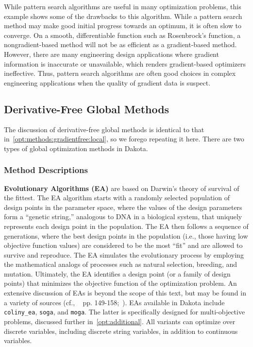 While pattern search algorithms are useful in many optimization
problems, this example shows some of the drawbacks to this algorithm.
While a pattern search method may make good initial progress towards
an optimum, it is often slow to converge. On a smooth, differentiable
function such as Rosenbrock's function, a nongradient-based method
will not be as efficient as a gradient-based method. However, there
are many engineering design applications where gradient information is
inaccurate or unavailable, which renders gradient-based optimizers
ineffective. Thus, pattern search algorithms are often good choices in
complex engineering applications when the quality of gradient data is
suspect.

\subsection{Derivative-Free Global Methods}
\label{opt:methods:gradientfree:global}

The discussion of derivative-free global methods is identical to that
in~\ref{opt:methods:gradientfree:local}, so we forego repeating it
here.  There are two types of global optimization methods in Dakota.

\subsubsection{Method Descriptions}
\label{opt:methods:gradientfree:global:descriptions}

{\bf Evolutionary Algorithms (EA)} are based on Darwin's theory of
survival of the fittest. The EA algorithm starts with a randomly
selected population of design points in the parameter space, where the
values of the design parameters form a ``genetic string,'' analogous
to DNA in a biological system, that uniquely represents each design
point in the population. The EA then follows a sequence of
generations, where the best design points in the population (i.e.,
those having low objective function values) are considered to be the
most ``fit'' and are allowed to survive and reproduce. The EA
simulates the evolutionary process by employing the mathematical
analogs of processes such as natural selection, breeding, and
mutation. Ultimately, the EA identifies a design point (or a family of
design points) that minimizes the objective function of the
optimization problem. An extensive discussion of EAs is beyond the
scope of this text, but may be found in a variety of sources (cf.,
~\cite{Haf92} pp. 149-158;~\cite{Gol89}). EAs available in Dakota
include \texttt{coliny\_ea}, \texttt{soga}, and \texttt{moga}.  The
latter is specifically designed for multi-objective problems,
discussed further in~\ref{opt:additional}.  All variants can optimize
over discrete variables, including discrete string variables, in 
addition to continuous variables.

